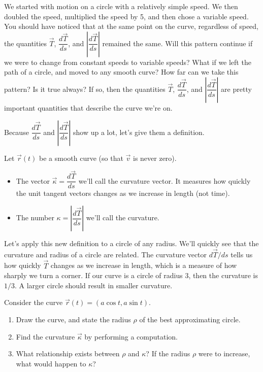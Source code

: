 We started with motion on a circle with a relatively simple speed.  We then doubled the speed, multiplied the speed by 5, and then chose a variable speed.  You should have noticed that at the same point on the curve, regardless of speed, the quantities $\vec T$, $\dfrac{d\vec T}{ds}$, and $\left|\dfrac{d\vec T}{ds}\right|$ remained the same. Will this pattern continue if we were to change from constant speeds to variable speeds?  What if we left the path of a circle, and moved to any smooth curve? How far can we take this pattern?  Is it true always?  If so, then the quantities $\vec T$, $\dfrac{d\vec T}{ds}$, and $\left|\dfrac{d\vec T}{ds}\right|$ are pretty important quantities that describe the curve we're on. 

Because $\dfrac{d\vec T}{ds}$ and $\left|\dfrac{d\vec T}{ds}\right|$ show up a lot, let's give them a definition.
\begin{definition}
 Let $\vec r(t)$ be a smooth curve (so that $\vec v$ is never zero).
\begin{itemize}
 \item The vector $\vec \kappa = \dfrac{d\vec T}{ds}$ we'll call the curvature vector. It measures how quickly the unit tangent vectors changes as we increase in length (not time).
 \item The number $\kappa = \left|\dfrac{d\vec T}{ds}\right|$ we'll call the curvature.
\end{itemize}
\end{definition}


Let's apply this new definition to a circle of any radius.  We'll quickly see that the curvature and radius of a circle are related.
The curvature vector $d\vec T/ds$ tells us how quickly $\vec T$ changes as we increase in length, which is a measure of how sharply we turn a corner.  If our curve is a circle of radius $3$, then the curvature is $1/3$.  A larger circle should result in smaller curvature.  

\begin{problem}
 Consider the curve $\vec r(t)=(a\cos t, a\sin t)$.
 \begin{enumerate}
  \item Draw the curve, and state the radius $\rho$ of the best approximating circle.
  \item Find the curvature $\vec \kappa$ by performing a computation.
  \item What relationship exists between $\rho$ and $\kappa$?  If the radius $\rho$ were to increase, what would happen to $\kappa$?
 \end{enumerate}
\end{problem}

